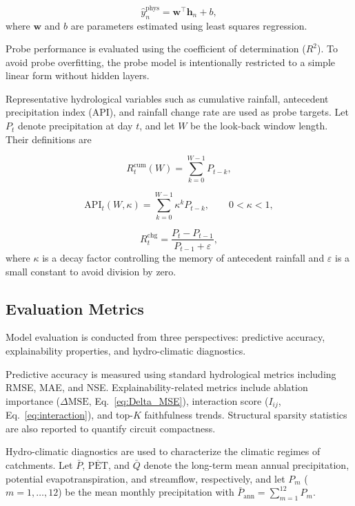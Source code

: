 \begin{equation}
    \hat{y}_n^{\mathrm{phys}}=\mathbf{w}^{\top}\mathbf{h}_n+b,
\end{equation}
where $\mathbf{w}$ and $b$ are parameters estimated using least squares regression.

Probe performance is evaluated using the coefficient of determination ($R^2$). To avoid probe overfitting, the probe model is intentionally restricted to a simple linear form without hidden layers.

Representative hydrological variables such as cumulative rainfall\cite{PIRONE2023128949}, antecedent precipitation index (API)\cite{CAMELS}, and rainfall change rate are used as probe targets. Let $P_t$ denote precipitation at day $t$, and let $W$ be the look-back window length. Their definitions are

\begin{equation}
    R^{\mathrm{cum}}_t(W)=\sum_{k=0}^{W-1} P_{t-k},
\end{equation}

\begin{equation}
    \mathrm{API}_t(W,\kappa)=\sum_{k=0}^{W-1}\kappa^{k}P_{t-k}, \qquad 0<\kappa<1,
\end{equation}

\begin{equation}
    R^{\mathrm{chg}}_t=\frac{P_t-P_{t-1}}{P_{t-1}+\varepsilon},
\end{equation}
where $\kappa$ is a decay factor controlling the memory of antecedent rainfall and $\varepsilon$ is a small constant to avoid division by zero.

\subsection{Evaluation Metrics}

Model evaluation is conducted from three perspectives: predictive accuracy, explainability properties, and hydro-climatic diagnostics.

Predictive accuracy is measured using standard hydrological metrics including RMSE\cite{WRR_RMSE}, MAE\cite{WRR_MAE}, and NSE\cite{WRR_NSE}. Explainability-related metrics include ablation importance ($\Delta\mathrm{MSE}$, Eq.~\ref{eq:Delta_MSE}), interaction score ($I_{ij}$, Eq.~\ref{eq:interaction}), and top-$K$ faithfulness\cite{7552539} trends. Structural sparsity statistics are also reported to quantify circuit compactness.

Hydro-climatic diagnostics are used to characterize the climatic regimes of catchments. Let $\bar{P}$, $\overline{\mathrm{PET}}$, and $\bar{Q}$ denote the long-term mean annual precipitation, potential evapotranspiration, and streamflow, respectively, and let $P_m$ ($m=1,\dots,12$) be the mean monthly precipitation with $\bar{P}_{\mathrm{ann}}=\sum_{m=1}^{12}P_m$.

